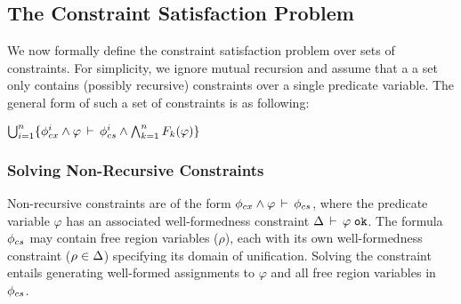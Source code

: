 \subsection{The Constraint Satisfaction Problem}

We now formally define the constraint satisfaction problem over sets
of constraints. For simplicity, we ignore mutual recursion and assume
that a a set only contains (possibly recursive) constraints over a
single predicate variable. The general form of such a set of
constraints is as following:
\begin{center}
\(
  \bigcup_{i=1}^n \{
    \phi_{cx}^{i} \wedge \varphi\,\vdash\,\phi_{cs}^{i} \wedge \bigwedge_{k=1}^n F_k(\varphi)
  \}
\)
\end{center}


\subsubsection{Solving Non-Recursive Constraints}

Non-recursive constraints are of the form $\phi_{cx} \wedge
\varphi\,\vdash\,\phi_{cs}$, where the predicate variable $\varphi$ has an
associated well-formedness constraint $\Delta\,\vdash\,\varphi \; \texttt{ok}$.  The
formula $\phi_{cs}$ may contain free region variables ($\rho$), each
with its own well-formedness constraint ($\rho \in \Delta$)
specifying its domain of unification. Solving the constraint entails
generating well-formed assignments to $\varphi$ and all free region
variables in $\phi_{cs}$.


